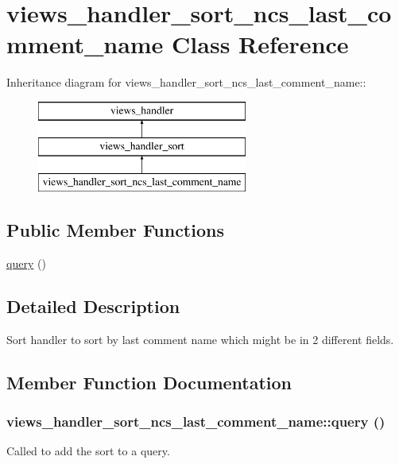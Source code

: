 \hypertarget{classviews__handler__sort__ncs__last__comment__name}{
\section{views\_\-handler\_\-sort\_\-ncs\_\-last\_\-comment\_\-name Class Reference}
\label{classviews__handler__sort__ncs__last__comment__name}
}
Inheritance diagram for views\_\-handler\_\-sort\_\-ncs\_\-last\_\-comment\_\-name::\begin{figure}[H]
\begin{center}
\leavevmode
\includegraphics[height=3cm]{classviews__handler__sort__ncs__last__comment__name}
\end{center}
\end{figure}
\subsection*{Public Member Functions}
\begin{DoxyCompactItemize}
\item 
\hyperlink{classviews__handler__sort__ncs__last__comment__name_a23a0eb15347f118155df094a2cadd249}{query} ()
\end{DoxyCompactItemize}


\subsection{Detailed Description}
Sort handler to sort by last comment name which might be in 2 different fields. 

\subsection{Member Function Documentation}
\hypertarget{classviews__handler__sort__ncs__last__comment__name_a23a0eb15347f118155df094a2cadd249}{
\subsubsection[{query}]{\setlength{\rightskip}{0pt plus 5cm}views\_\-handler\_\-sort\_\-ncs\_\-last\_\-comment\_\-name::query ()}}
\label{classviews__handler__sort__ncs__last__comment__name_a23a0eb15347f118155df094a2cadd249}
Called to add the sort to a query. 


